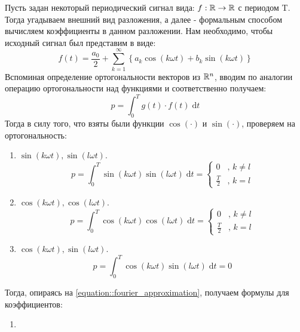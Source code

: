 Пусть задан некоторый периодический сигнал вида: $f: \mathbb{R} \to \mathbb{R}$ с периодом T. Тогда угадываем внешний вид разложения, а далее - формальным способом вычисляем коэффициенты в данном разложении. Нам необходимо, чтобы исходный сигнал был представим в виде:
\begin{equation} \label{equation::fourier_approximation}
	f(t) = \frac{a_0}{2} + \sum_{k = 1}^{\infty} \left\{a_k\cos(k \omega t) + b_k\sin(k \omega t)\right\}
\end{equation}
Вспоминая определение ортогональности векторов из $\mathbb{R}^n$, вводим по аналогии операцию ортогональности над функциями и соответственно получаем:
\begin{equation}
	p = \int_0^T g(t) \cdot f(t) \; \text{d}t
\end{equation}
Тогда в силу того, что взяты были функции $\cos(\cdot)$ и $\sin(\cdot)$, проверяем на ортогональность:
\begin{enumerate}
	\item $\sin(k\omega t), \sin(l \omega t)$.
	\begin{equation}
		p = \int_{0}^T \sin(k\omega t)\sin(l \omega t) \; \text{d}t =
		\left\{
		\begin{array}{rl}
			0 & \text{, } k \ne l\\
			\frac{T}{2} & \text{, } k = l
		\end{array}
		\right.
	\end{equation}
	
	\item $\cos(k\omega t), \cos(l \omega t)$.
	\begin{equation}
		p = \int_{0}^T \cos(k\omega t)\cos(l \omega t) \; \text{d}t =
		\left\{
		\begin{array}{rl}
			0 & \text{, } k \ne l\\
			\frac{T}{2} & \text{, } k = l
		\end{array}
		\right.
	\end{equation}

	\item $\cos(k\omega t), \sin(l \omega t)$.
	\begin{equation}
		p = \int_{0}^T \cos(k\omega t)\sin(l \omega t) \; \text{d}t = 0
	\end{equation}
\end{enumerate}
Тогда, опираясь на \ref{equation::fourier_approximation}, получаем формулы для коэффициентов:
\begin{enumerate}
	\item 
\end{enumerate}